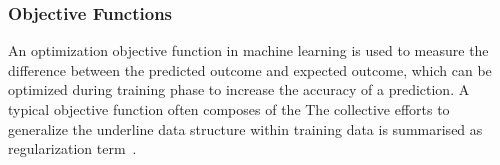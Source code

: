 \subsubsection{Objective Functions}
An optimization objective function in machine learning is used to measure the difference between the predicted outcome and expected outcome, which can be optimized during training phase to increase the accuracy of a prediction. A typical objective function often composes of the The collective efforts to generalize the underline data structure within training data is summarised as regularization term~\cite{goodfellow_2015}.  